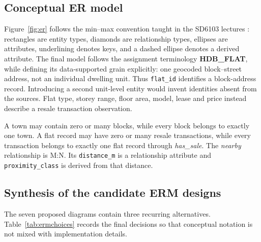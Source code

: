 \documentclass[11pt,a4paper]{article}
\begin{document}
\subsection{Conceptual ER model}
Figure~\ref{fig:er} follows the min--max convention taught in the
SD6103 lectures \citep{ntu2026er}: rectangles are entity types, diamonds are relationship types, ellipses
are attributes, underlining denotes keys, and a dashed ellipse denotes a derived
attribute. The final model follows the assignment terminology \textbf{HDB\_FLAT}, while
defining its data-supported grain explicitly: one geocoded block--street address, not an
individual dwelling unit. Thus \texttt{flat\_id} identifies a block-address record.
Introducing a second unit-level entity would invent identities absent from the sources.
Flat type, storey range, floor area, model, lease and price instead describe a resale
transaction observation.

A town may contain zero or many blocks, while every block belongs to exactly one town.
A flat record may have zero or many resale transactions, while every transaction belongs
to exactly one flat record through \emph{has\_sale}. The \emph{nearby} relationship is
M:N. Its \texttt{distance\_m} is a
relationship attribute and \texttt{proximity\_class} is derived from that distance.

\subsection{Synthesis of the candidate ERM designs}
The seven proposed diagrams contain three recurring alternatives. Table~\ref{tab:ermchoices}
records the final decisions so that conceptual notation is not mixed with implementation
details.
\end{document}
